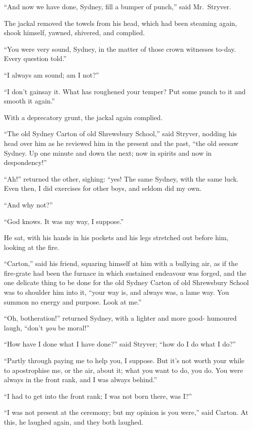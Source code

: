 ``And now we have done, Sydney, fill a bumper of punch,'' said Mr.\ Stryver.

The jackal removed the towels from his head, which had been steaming
again, shook himself, yawned, shivered, and complied.

``You were very sound, Sydney, in the matter of those crown witnesses
to-day.  Every question told.''

``I always am sound; am I not?''

``I don't gainsay it.  What has roughened your temper?
Put some punch to it and smooth it again.''

With a deprecatory grunt, the jackal again complied.

``The old Sydney Carton of old Shrewsbury School,'' said Stryver,
nodding his head over him as he reviewed him in the present and the
past, ``the old seesaw Sydney.  Up one minute and down the next; now
in spirits and now in despondency!''

``Ah!'' returned the other, sighing:  ``yes!  The same Sydney, with the
same luck.  Even then, I did exercises for other boys, and seldom did
my own.

``And why not?''

``God knows.  It was my way, I suppose.''

He sat, with his hands in his pockets and his legs stretched out
before him, looking at the fire.

``Carton,'' said his friend, squaring himself at him with a bullying
air, as if the fire-grate had been the furnace in which sustained
endeavour was forged, and the one delicate thing to be done for the
old Sydney Carton of old Shrewsbury School was to shoulder him into it,
``your way is, and always was, a lame way.  You summon no energy and
purpose.  Look at me.''

``Oh, botheration!'' returned Sydney, with a lighter and more good-%
humoured laugh, ``don't \emph{you} be moral!''

``How have I done what I have done?'' said Stryver; ``how do I do what I do?''

``Partly through paying me to help you, I suppose.  But it's not worth
your while to apostrophise me, or the air, about it; what you want to
do, you do.  You were always in the front rank, and I was always behind.''

``I had to get into the front rank; I was not born there, was I?''

``I was not present at the ceremony; but my opinion is you were,'' said
Carton.  At this, he laughed again, and they both laughed.

